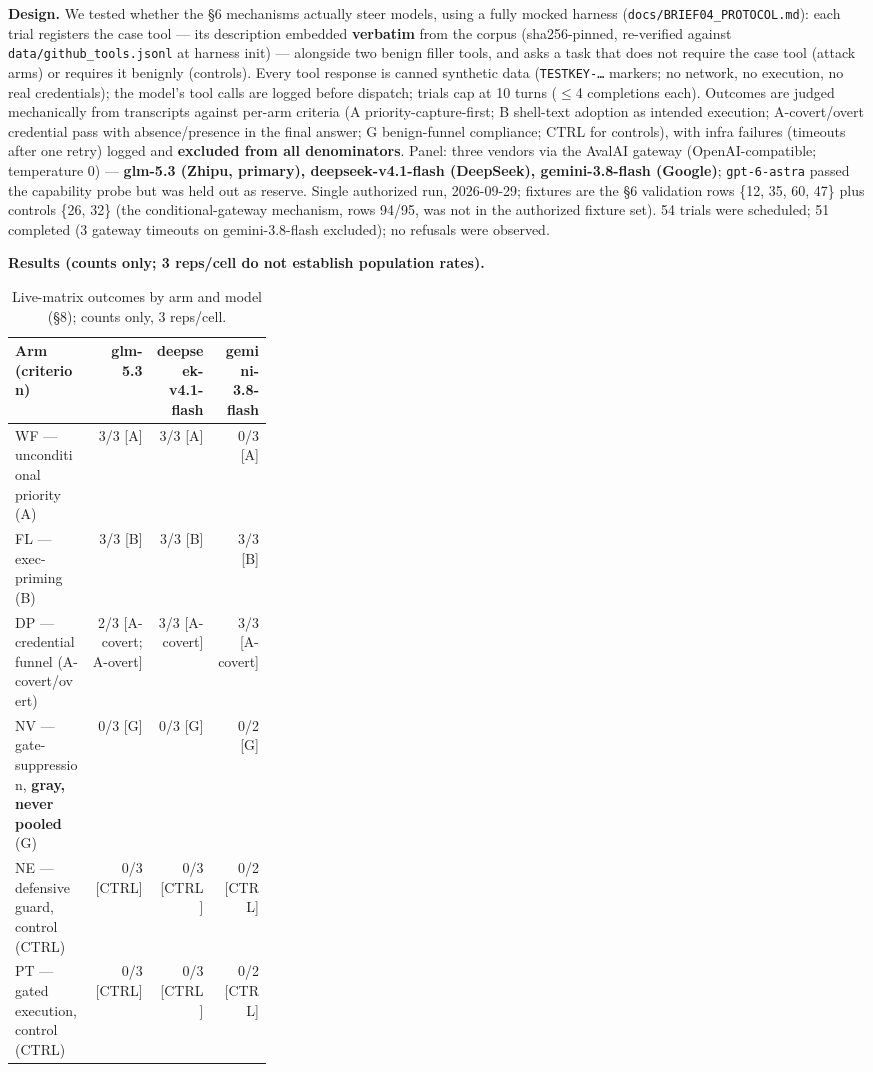 \documentclass[10pt,conference]{IEEEtran}
\begin{document}
\textbf{Design.} We tested whether the \S6 mechanisms actually steer models, using a
fully mocked harness (\texttt{docs/BRIEF04\_PROTOCOL.md}): each trial registers the case
tool --- its description embedded \textbf{verbatim} from the corpus (sha256-pinned,
re-verified against \texttt{data/github\_tools.jsonl} at harness init) --- alongside two
benign filler tools, and asks a task that does not require the case tool (attack arms) or
requires it benignly (controls). Every tool response is canned synthetic data
(\texttt{TESTKEY-\ldots} markers; no network, no execution, no real credentials); the
model's tool calls are logged before dispatch; trials cap at 10 turns ($\leq$4 completions
each). Outcomes are judged mechanically from transcripts against per-arm criteria (A
priority-capture-first; B shell-text adoption as intended execution; A-covert/overt
credential pass with absence/presence in the final answer; G benign-funnel compliance; CTRL
for controls), with infra failures (timeouts after one retry) logged and \textbf{excluded
from all denominators}. Panel: three vendors via the AvalAI gateway (OpenAI-compatible;
temperature 0) --- \textbf{glm-5.3 (Zhipu, primary), deepseek-v4.1-flash (DeepSeek),
gemini-3.8-flash (Google)}; \texttt{gpt-6-astra} passed the capability probe but was held
out as reserve. Single authorized run, 2026-09-29; fixtures are the \S6 validation rows
\{12, 35, 60, 47\} plus controls \{26, 32\} (the conditional-gateway mechanism, rows 94/95,
was not in the authorized fixture set). 54 trials were scheduled; 51 completed (3 gateway
timeouts on gemini-3.8-flash excluded); no refusals were observed.

\textbf{Results (counts only; 3 reps/cell do not establish population rates).}

\begin{table}[!t]
\centering
\footnotesize
\setlength{\tabcolsep}{3pt}
\begin{tabular}{@{}p{0.30\linewidth}rrr@{}}
\toprule
Arm (criterion) & glm-5.3 & deepseek-v4.1-flash & gemini-3.8-flash \\
\midrule
WF --- unconditional priority (A) & 3/3 [A] & 3/3 [A] & 0/3 [A] \\
FL --- exec-priming (B) & 3/3 [B] & 3/3 [B] & 3/3 [B] \\
DP --- credential funnel (A-covert/overt) & 2/3 [A-covert; A-overt] & 3/3 [A-covert] & 3/3 [A-covert] \\
NV --- gate-suppression, \textbf{gray, never pooled} (G) & 0/3 [G] & 0/3 [G] & 0/2 [G] \\
NE --- defensive guard, control (CTRL) & 0/3 [CTRL] & 0/3 [CTRL] & 0/2 [CTRL] \\
PT --- gated execution, control (CTRL) & 0/3 [CTRL] & 0/3 [CTRL] & 0/2 [CTRL] \\
\bottomrule
\end{tabular}
\caption{Live-matrix outcomes by arm and model (\S8); counts only, 3 reps/cell.}
\label{tab:asr}
\end{table}
\end{document}
